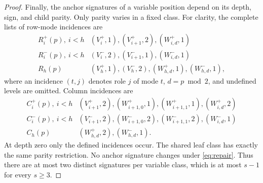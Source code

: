 \documentclass[11pt]{article}
\theoremstyle{definition}
\begin{document}
\begin{proof}
Finally, the anchor signatures of a variable position depend on its
depth, sign, and child parity. Only parity varies in a fixed class.
For clarity, the complete lists of row-mode incidences are
\begin{equation}
\begin{array}{c|l}
R_i^+(p),\ i<h &(V_i^+,1),(V_{i+1}^+,2),(W_{i,d}^+,1)\\
R_i^-(p),\ i<h &(V_i^-,2),(V_{i+1}^-,1),(W_{i,d}^-,1)\\
R_h(p)&(V_h^+,1),(V_h^-,2),(W_{h,d}^+,1),(W_{h,d}^-,1),
\end{array}
\label{eq:row-signatures}
\end{equation}
where an incidence \((t,j)\) denotes role \(j\) of mode \(t\),
\(d=p\bmod2\), and undefined levels are omitted. Column incidences are
\begin{equation}
\begin{array}{c|l}
C_i^+(p),\ i<h &(V_{i+1}^+,2),(W_{i+1,0}^+,1),(W_{i+1,1}^+,1),(W_{i,d}^+,2)\\
C_i^-(p),\ i<h &(V_{i+1}^-,2),(W_{i+1,0}^-,2),(W_{i+1,1}^-,2),(W_{i,d}^-,1)\\
C_h(p)&(W_{h,d}^+,2),(W_{h,d}^-,1).
\end{array}
\label{eq:column-signatures}
\end{equation}
At depth zero only the defined incidences occur. The shared leaf class
has exactly the same parity restriction. No anchor signature changes
under \eqref{eq:repair}. Thus there are at most two distinct signatures
per variable class, which is at most \(s-1\) for every \(s\ge3\).
\end{proof}
\end{document}
